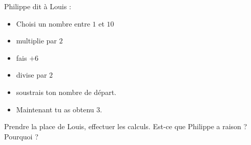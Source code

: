 
\begin{exercice}\label{exosmath-0915}

Philippe dit à Louis :
\begin{itemize}
    \item Choisi un nombre entre \( 1\) et \( 10\)
    \item multiplie par \( 2\)
    \item fais \( +6\)
    \item divise par \( 2\)
    \item soustrais ton nombre de départ.
    \item Maintenant tu as obtenu \( 3\).
\end{itemize}
Prendre la place de Louis, effectuer les calculs. Est-ce que Philippe a raison ? Pourquoi ?

\end{exercice}
